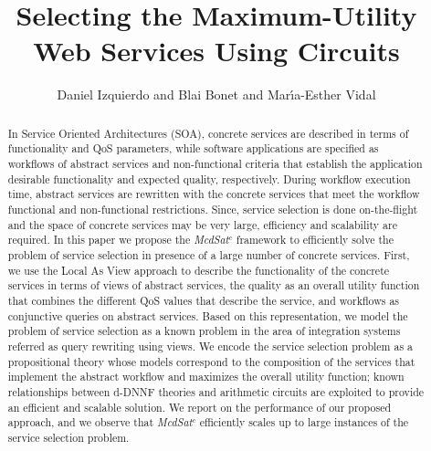 \documentclass{llncs}
\begin{document}
\allowdisplaybreaks
\title{Selecting the Maximum-Utility  Web Services  Using Circuits}
\author{Daniel Izquierdo   and Blai Bonet   and Mar\'{\i}a-Esther Vidal }

 \maketitle
\begin{abstract}
In Service Oriented Architectures (SOA), concrete services are described in terms of functionality   and QoS parameters, while software applications are specified as workflows of abstract services and non-functional criteria that establish the  application desirable functionality and  expected quality, respectively.  During workflow execution time,  abstract services  are rewritten 
with the concrete services  that meet the workflow  functional and non-functional restrictions. Since, service selection is done on-the-flight and the space of concrete services may be very large, efficiency and scalability are required.  In this paper we propose the {\it McdSat}$^c$ framework to efficiently solve the problem of service selection in presence of a large number of concrete services.
First, we use the Local As View approach to describe the functionality  of the concrete services in terms of views of abstract services, the quality as an overall utility function that combines the different QoS values that describe the service, and  workflows as  conjunctive queries on abstract services. Based on this representation, we 
model the problem of service selection as a known problem in the area of integration systems referred as query rewriting using views.  We encode the service selection problem as a propositional theory whose models correspond to the composition of the services that implement the abstract workflow and maximizes the overall utility function; known relationships between d-DNNF theories and arithmetic circuits are exploited to provide an efficient and scalable solution.  We report on the performance of our proposed approach, and we observe that  {\it McdSat}$^c$  efficiently scales up to large instances of the service selection problem.  
 
 
\end{abstract}                
\end{document}
